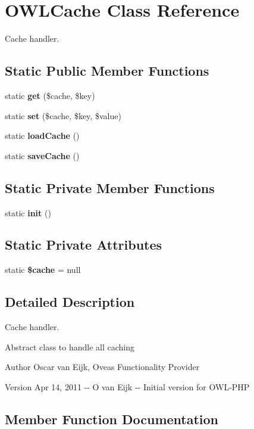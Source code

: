 \section{OWLCache Class Reference}
\label{classOWLCache}


Cache handler.  


\subsection*{Static Public Member Functions}
\begin{DoxyCompactItemize}
\item 
static {\bf get} (\$cache, \$key)
\item 
static {\bf set} (\$cache, \$key, \$value)
\item 
static {\bf loadCache} ()
\item 
static {\bf saveCache} ()
\end{DoxyCompactItemize}
\subsection*{Static Private Member Functions}
\begin{DoxyCompactItemize}
\item 
static {\bf init} ()
\end{DoxyCompactItemize}
\subsection*{Static Private Attributes}
\begin{DoxyCompactItemize}
\item 
static {\bf \$cache} = null
\end{DoxyCompactItemize}


\subsection{Detailed Description}
Cache handler. 

Abstract class to handle all caching \begin{DoxyAuthor}{Author}
Oscar van Eijk, Oveas Functionality Provider 
\end{DoxyAuthor}
\begin{DoxyVersion}{Version}
Apr 14, 2011 -\/-\/ O van Eijk -\/-\/ Initial version for OWL-\/PHP 
\end{DoxyVersion}


\subsection{Member Function Documentation}
